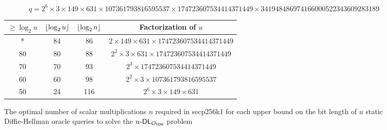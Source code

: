 \begin{figure}[h]
  \centering
  \[ q = 2^6 \times 3 \times 149 \times 631 \times 107361 793816 595537 \times 174 723607 534414 371449 \times 341 948486 974166 000522 343609 283189  \]
 \begin{tabular}{||c c c c||}
 \hline
 $\geq \log_2u $ & $\left\lfloor \log_2u\right\rfloor$ & $\left\lfloor \log_2n\right\rfloor$ & Factorization of $u$ \\ [0.5ex]
 \hline\hline
  * & 84 & 86 & $2 \times 149 \times 631 \times 174723607534414371449$ \\
  \hline
  80 & 80 & 88 & $2^2 \times 3 \times 631 \times 174723607534414371449$ \\
  \hline
  70 & 70 & 93 & $2^3 \times 174723607534414371449$ \\
  \hline
  60 & 60 & 98 & $2^2 \times 3 \times 107361793816595537$ \\
  \hline
  50 & 24 & 116 & $2^6 \times 3 \times 149 \times 631$ \\ [1ex]
  \hline
 \hline
\end{tabular}
\caption{The optimal number of scalar multiplications $n$ required in secp256k1 for each upper bound on the bit length of $u$ static Diffie-Hellman oracle queries to solve the $u\text{-}\textsf{DL}_{\mathcal{O}_{\textsf{SDH}}}$ problem}
\label{fig:sdh_alg_time}
\end{figure}
